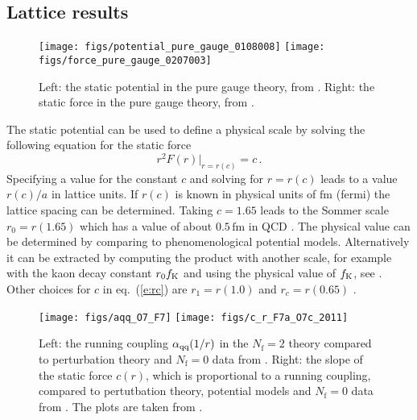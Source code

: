 \documentclass{PoS}
\newcommand{\eq}[1]{eq.~(\ref{#1})}
\def\nf{N_{\mathrm{f}}}
\def\aqqr{\alpha_{\rm qq}(1/r)}
\begin{document}
\subsection{Lattice results}
%
\begin{figure}[t]\centering
\texttt{[image: figs/potential\_pure\_gauge\_0108008]}
\hspace{0.1cm}
\texttt{[image: figs/force\_pure\_gauge\_0207003]}
\caption{Left: the static potential in the pure gauge theory, from \cite{Necco:2001xg}. Right: the static force in the pure gauge theory, from \cite{Luscher:2002qv}.}
  \label{f:potquenched}
\end{figure}
%

The static potential can be used to define a physical scale by solving
the following equation for the static force
\begin{equation}\label{e:rc}
r^2 F(r)|_{r=r(c)} = c \,.
\end{equation}
Specifying a value for the constant $c$ and solving for $r=r(c)$ leads to a
value $r(c)/a$ in lattice units. If $r(c)$ is known in physical units of
$\mathrm{fm}$ (fermi) the lattice spacing can be determined. Taking
$c=1.65$ leads to the Sommer scale $r_0=r(1.65)$ which has a value
of about $0.5\,\mathrm{fm}$ in QCD \cite{Sommer:1993ce}. The physical value
can be determined by comparing to phenomenological potential models.
Alternatively it can be extracted by computing the product with another
scale, for example with the kaon decay constant $r_0f_{\rm K}$ and using
the physical value of $f_{\rm K}$, see \cite{Fritzsch:2012wq}.
Other choices for $c$ in \eq{e:rc} are $r_1=r(1.0)$ \cite{Bernard:2000gd}
and $r_c=r(0.65)$ \cite{Necco:2001xg}.
%
\begin{figure}[t]\centering
\texttt{[image: figs/aqq\_O7\_F7]}
\hspace{0.5cm}
\texttt{[image: figs/c\_r\_F7a\_O7c\_2011]}
\caption{Left: the running coupling $\aqqr$ in the $\nf=2$ theory compared to
perturbation theory and $\nf=0$ data from \cite{Necco:2001xg}. Right: the slope of the static force $c(r)$, which is proportional to a running coupling, compared to pertutbation theory, potential models and $\nf=0$ data from \cite{Luscher:2002qv}. The plots are taken from \cite{Leder:2011pz}.}
  \label{f:couplings}
\end{figure}
%
\end{document}
